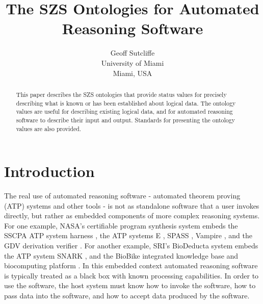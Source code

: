 \documentclass[a4paper]{easychair}
\begin{document}
\title{The SZS Ontologies for 
       Automated Reasoning Software}


\author{Geoff Sutcliffe \\
        {\footnotesize University of Miami}\\
        {\footnotesize Miami, USA}
}


\maketitle

%
\begin{abstract}
This paper describes the SZS ontologies that provide status values for 
precisely describing what is known or has been established about logical data.
The ontology values are useful for describing existing logical data, and
for automated reasoning software to describe their input and output.
Standards for presenting the ontology values are also provided.
\end{abstract}

\section{Introduction}
\label{Introduction}

The real use of automated reasoning software - automated theorem proving
(ATP) systems and other tools -
is not as standalone software that a user invokes directly, but rather
as embedded components of more complex reasoning systems.
For one example, NASA's certifiable program synthesis system \cite{DFS04-IJCAR}
embeds the SSCPA ATP system harness \cite{SS99-FLAIRS}, the ATP systems
E \cite{Sch02-AICOMM}, SPASS \cite{WS+07}, Vampire \cite{RV02-AICOMM},
and the GDV derivation verifier \cite{Sut06}.
For another example, SRI's BioDeducta system \cite{SW+07} embeds the
ATP system SNARK \cite{Sti-SNARK-URL}, and the BioBike integrated knowledge
base and biocomputing platform \cite{MT+05}.
In this embedded context automated reasoning software is typically
treated as a black box with known processing capabilities.
In order to use the software, the host system must know how to invoke the
software, how to pass data into the software, and how to accept data
produced by the software.
\end{document}
